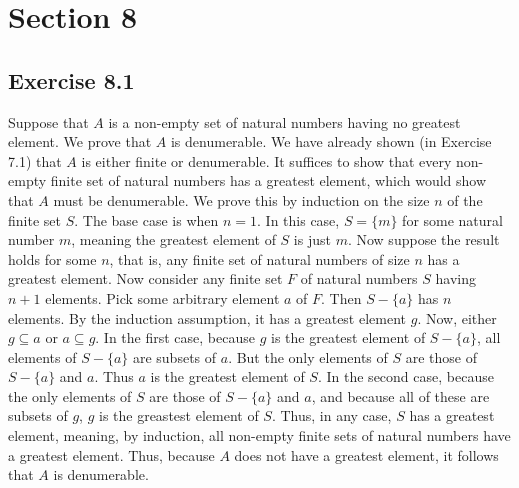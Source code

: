 \documentclass{article}
\theoremstyle{definition}
\begin{document}
\section*{Section 8}

\subsection*{Exercise 8.1}
Suppose that $A$ is a non-empty set of natural numbers having no greatest element. We prove that $A$ is denumerable. We have already shown (in Exercise 7.1) that $A$ is either finite or 
denumerable. It suffices to show that every non-empty finite set of natural numbers has a greatest element, which would show that $A$ must be denumerable. We prove this by induction on the size $n$ of 
the finite set $S$. The base case is when $n=1$. In this case, $S=\{m\}$ for some natural number $m$, meaning the greatest element of $S$ is just $m$. Now suppose the result holds for some 
$n$, that is, any finite set of natural numbers of size $n$ has a greatest element. Now consider any finite set $F$ of natural numbers $S$ having $n+1$ elements. Pick some arbitrary element $a$ 
of $F$. Then $S-\{a\}$ has $n$ elements. By the induction assumption, it has a greatest element $g$. Now, either $g\subseteq a$ or $a\subseteq g$. In the first case, because $g$ is the 
greatest element of $S-\{a\}$, all elements of $S-\{a\}$ are subsets of $a$. But the only elements of $S$ are those of $S-\{a\}$ and $a$. Thus $a$ is the greatest element of $S$. In the 
second case, because the only elements of $S$ are those of $S-\{a\}$ and $a$, and because all of these are subsets of $g$, $g$ is the greastest element of $S$. Thus, in any case, 
$S$ has a greatest element, meaning, by induction, all non-empty finite sets of natural numbers have a greatest element. Thus, because $A$ does not have a greatest element, it follows that 
$A$ is denumerable. 
\end{document}
